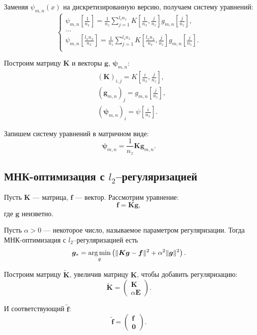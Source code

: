 \documentclass[../paper.tex]{subfiles}
\begin{document}
Заменяя $\psi_{m,n}(x)$ на дискретизированную версию, получаем систему уравнений:
\[
	\begin{cases}
		\psi_{m,n}\left[ \frac{1}{n_x} \right]
		= \frac{1}{n_z} \sum_{j=1}^{l_z n_z} K\left[\frac{1}{n_x}, \frac{j}{n_z}\right] g_{m,n}\left[\frac{j}{n_z}\right],\\
		\dots\\
		\psi_{m,n}\left[ \frac{l_x n_x}{n_x} \right]
		= \frac{1}{n_z} \sum_{j=1}^{l_z n_z} K\left[\frac{l_x n_x}{n_x}, \frac{j}{n_z}\right] g_{m,n}\left[\frac{j}{n_z}\right].\\
	\end{cases}
\]

Построим матрицу $\bm{K}$ и векторы $\bm{g}$, $\bm{\psi}_{m,n}$:
\begin{align*}
	&\left(\bm{K}\right)_{i,j}    = K\left[\frac{i}{n_x}, \frac{j}{n_z}\right],\\
	&\left(\bm{g}_{m,n}\right)_j      = g_{m,n}\left[\frac{j}{n_z}\right],\\
	&\left(\bm{\psi}_{m,n}\right)_i = \psi\left[\frac{i}{n_x}\right].
\end{align*}

Запишем систему уравнений в матричном виде:
\[
	\bm{\psi}_{m,n} = \frac{1}{n_z} \bm{K} \bm{g}_{m,n}
.\]

\subsection{МНК-оптимизация с $l_2$--регуляризацией}
\begin{Def}
	Пусть $\bm{K}$ --- матрица, $\bm{f}$ --- вектор.
	Рассмотрим уравнение:
	\[
		\bm{f} = \bm{K}\bm{g}
	,\] где $\bm{g}$ неизветно.

	Пусть $\alpha > 0$ --- некоторое число, называемое параметром регуляризации.
	Тогда МНК-оптимизация с $l_2$--регуляризацией есть
	\[
		\bm{g}_{*} = \operatorname*{arg\,min}_g \left( \| \bm{K}\bm{g} - \bm{f} \|^2 + \alpha^2 \|\bm{g}\|^2 \right)
	.\]
\end{Def}

Построим матрицу $\bm{\tilde K}$, увеличив матрицу $\bm{K}$, чтобы добавить регуляризацию:
\[
	\bm{\tilde K} = 
	\begin{pmatrix}
	    \bm{K} \\
	    \alpha \bm{E}
	\end{pmatrix}
.\]

И соответствующий $\bm{\tilde f}$:
\[
	\bm{\tilde f} = 
	\begin{pmatrix}
	    \bm{f} \\
	    \bm{0}
	\end{pmatrix}
.\]
\end{document}

